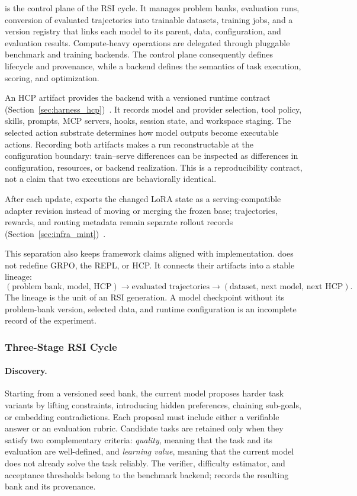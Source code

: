 \mindforge{} is the control plane of the RSI cycle. It manages problem banks, evaluation runs, conversion of evaluated trajectories into trainable datasets, training jobs, and a version registry that links each model to its parent, data, configuration, and evaluation results. Compute-heavy operations are delegated through pluggable benchmark and training backends. The control plane consequently defines lifecycle and provenance, while a backend defines the semantics of task execution, scoring, and optimization.

An HCP artifact provides the backend with a versioned runtime contract (Section~\ref{sec:harness_hcp})~\citep{hcp_sdk2026}. It records model and provider selection, tool policy, skills, prompts, MCP servers, hooks, session state, and workspace staging. The selected action substrate determines how model outputs become executable actions. Recording both artifacts makes a run reconstructable at the configuration boundary: train--serve differences can be inspected as differences in configuration, resources, or backend realization. This is a reproducibility contract, not a claim that two executions are behaviorally identical.

After each update, \mint{} exports the changed LoRA state as a serving-compatible adapter revision instead of moving or merging the frozen base; trajectories, rewards, and routing metadata remain separate rollout records (Section~\ref{sec:infra_mint})~\citep{lu2026announcing}.

This separation also keeps framework claims aligned with implementation. \mindforge{} does not redefine GRPO, the REPL, or HCP. It connects their artifacts into a stable lineage:
\[
  (\text{problem bank},\, \text{model},\, \text{HCP})
  \longrightarrow \text{evaluated trajectories}
  \longrightarrow (\text{dataset},\, \text{next model},\, \text{next HCP}).
\]
The lineage is the unit of an RSI generation. A model checkpoint without its problem-bank version, selected data, and runtime configuration is an incomplete record of the experiment.

\subsubsection{Three-Stage RSI Cycle}
\label{sec:rsi_loop}

\paragraph{Discovery.}
Starting from a versioned seed bank, the current model proposes harder task variants by lifting constraints, introducing hidden preferences, chaining sub-goals, or embedding contradictions. Each proposal must include either a verifiable answer or an evaluation rubric. Candidate tasks are retained only when they satisfy two complementary criteria: \emph{quality}, meaning that the task and its evaluation are well-defined, and \emph{learning value}, meaning that the current model does not already solve the task reliably. The verifier, difficulty estimator, and acceptance thresholds belong to the benchmark backend; \mindforge{} records the resulting bank and its provenance.

